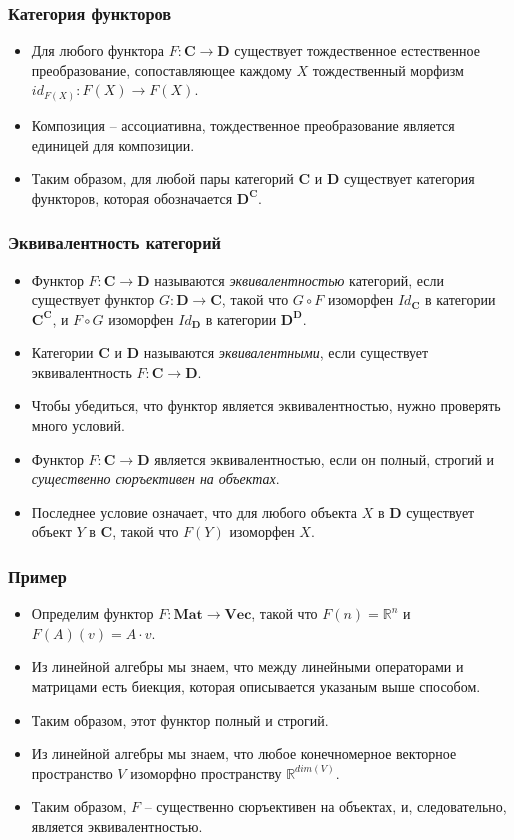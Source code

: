 \documentclass{beamer}
\theoremstyle{definition}
\newcommand{\cat}[1]{\mathbf{#1}}
\renewcommand{\C}{\cat{C}}
\newcommand{\D}{\cat{D}}
\renewcommand{\Vec}{\cat{Vec}}
\newcommand{\Mat}{\cat{Mat}}
\begin{document}
\begin{frame}
\frametitle{Категория функторов}
\begin{itemize}
\item Для любого функтора $F : \C \to \D$ существует тождественное естественное преобразование, сопоставляющее каждому $X$ тождественный морфизм $id_{F(X)} : F(X) \to F(X)$.
\item Композиция -- ассоциативна, тождественное преобразование является единицей для композиции.
\item Таким образом, для любой пары категорий $\C$ и $\D$ существует категория функторов, которая обозначается $\D^\C$.
\end{itemize}
\end{frame}

\begin{frame}
\frametitle{Эквивалентность категорий}
\begin{itemize}
\item Функтор $F : \C \to \D$ называются \emph{эквивалентностью} категорий, если существует функтор $G : \D \to \C$, такой что $G \circ F$ изоморфен $Id_\C$ в категории $\C^\C$, и $F \circ G$ изоморфен $Id_\D$ в категории $\D^\D$.
\item Категории $\C$ и $\D$ называются \emph{эквивалентными}, если существует эквивалентность $F : \C \to \D$.
\item Чтобы убедиться, что функтор является эквивалентностью, нужно проверять много условий.
\item Функтор $F : \C \to \D$ является эквивалентностью, если он полный, строгий и \emph{существенно сюръективен на объектах}.
\item Последнее условие означает, что для любого объекта $X$ в $\D$ существует объект $Y$ в $\C$, такой что $F(Y)$ изоморфен $X$.
\end{itemize}
\end{frame}

\begin{frame}
\frametitle{Пример}
\begin{itemize}
\item Определим функтор $F : \Mat \to \Vec$, такой что $F(n) = \mathbb{R}^n$ и $F(A)(v) = A \cdot v$.
\item Из линейной алгебры мы знаем, что между линейными операторами и матрицами есть биекция, которая описывается указаным выше способом.
\item Таким образом, этот функтор полный и строгий.
\item Из линейной алгебры мы знаем, что любое конечномерное векторное пространство $V$ изоморфно пространству $\mathbb{R}^{dim(V)}$.
\item Таким образом, $F$ -- существенно сюръективен на объектах, и, следовательно, является эквивалентностью.
\end{itemize}
\end{frame}
\end{document}
